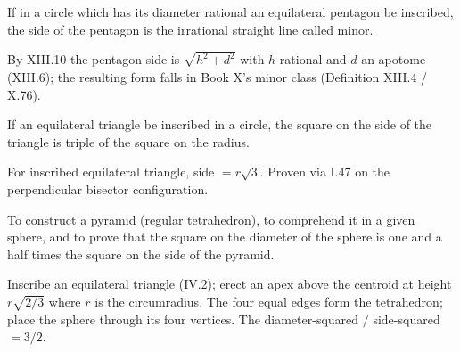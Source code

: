\documentclass{rrxiv}
\begin{document}
\begin{claim}
\label{prop:XIII.11}
If in a circle which has its diameter rational an equilateral
pentagon be inscribed, the side of the pentagon is the irrational
straight line called minor.
\end{claim}
\begin{evidence}
\label{ev:XIII.11}
By XIII.10 the pentagon side is $\sqrt{h^2 + d^2}$ with $h$ rational
and $d$ an apotome (XIII.6); the resulting form falls in Book X's
minor class (Definition XIII.4 / X.76).
\end{evidence}

\begin{claim}
\label{prop:XIII.12}
If an equilateral triangle be inscribed in a circle, the square on
the side of the triangle is triple of the square on the radius.
\end{claim}
\begin{evidence}
\label{ev:XIII.12}
For inscribed equilateral triangle, side $= r \sqrt{3}$.  Proven via
I.47 on the perpendicular bisector configuration.
\end{evidence}

\begin{claim}
\label{prop:XIII.13}
To construct a pyramid (regular tetrahedron), to comprehend it in a
given sphere, and to prove that the square on the diameter of the
sphere is one and a half times the square on the side of the pyramid.
\end{claim}
\begin{evidence}
\label{ev:XIII.13}
Inscribe an equilateral triangle (IV.2); erect an apex above the
centroid at height $r \sqrt{2/3}$ where $r$ is the circumradius.
The four equal edges form the tetrahedron; place the sphere through
its four vertices.  The diameter-squared $/$ side-squared $= 3/2$.
\end{evidence}
\end{document}
